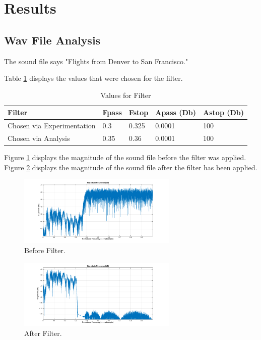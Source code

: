 \documentclass[conference]{IEEEtran}
\begin{document}
\section{Results}
\subsection{Wav File Analysis}
The sound file says "Flights from Denver to San Francisco."

Table \ref{table:filterValues} displays the values that were chosen for the filter.

\begin{table}[h]
\begin{tabular}{|l|l|l|l|l|}
\hline
\textbf{Filter}            & \textbf{Fpass} & \textbf{Fstop} & \textbf{Apass (Db)} & \textbf{Astop (Db)} \\ \hline
Chosen via Experimentation & 0.3               & 0.325               &  0.0001              & 100               \\ \hline
Chosen via Analysis        & 0.35               & 0.36               &   0.0001             & 100               \\ \hline
\end{tabular}
\label{table:filterValues}
\caption{Values for Filter}
\end{table}

Figure \ref{figure:beforeFilter} displays the magnitude of the sound file before the filter was applied. Figure \ref{figure:afterFilter} displays the magnitude of the sound file after the filter has been applied.

\begin{figure}[H]
\centering
\includegraphics[width=3.0in]{./figures/before_filter.png}
\caption{Before Filter.}
\label{figure:beforeFilter}
\end{figure}

\begin{figure}[H]
\centering
\includegraphics[width=3.0in]{./figures/after_filter.png}
\caption{After Filter.}
\label{figure:afterFilter}
\end{figure}
\end{document}
